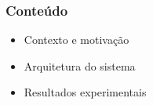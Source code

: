 \begin{frame}
	\frametitle{Conteúdo}
	\begin{itemize}
		\item Contexto e motivação
		\item Arquitetura do sistema
		\item Resultados experimentais
	\end{itemize}
\end{frame}